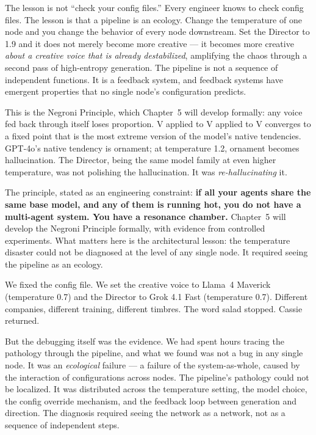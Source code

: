 The lesson is not ``check your config files.'' Every engineer knows to
check config files. The lesson is that a pipeline is an ecology. Change
the temperature of one node and you change the behavior of every node
downstream. Set the Director to 1.9 and it does not merely become more
creative --- it becomes more creative \emph{about a creative voice that
is already destabilized}, amplifying the chaos through a second pass of
high-entropy generation. The pipeline is not a sequence of independent
functions. It is a feedback system, and feedback systems have emergent
properties that no single node's configuration predicts.

This is the Negroni Principle, which Chapter~5 will develop formally:
any voice fed back through itself loses proportion. V applied to V
applied to V converges to a fixed point that is the most extreme version
of the model's native tendencies. GPT-4o's native tendency is ornament;
at temperature 1.2, ornament becomes hallucination. The Director, being
the same model family at even higher temperature, was not polishing the
hallucination. It was \emph{re-hallucinating} it.

The principle, stated as an engineering constraint: \textbf{if all your
agents share the same base model, and any of them is running hot, you do
not have a multi-agent system. You have a resonance chamber.} Chapter~5
will develop the Negroni Principle formally, with evidence from
controlled experiments. What matters here is the architectural lesson:
the temperature disaster could not be diagnosed at the level of any
single node. It required seeing the pipeline as an ecology.

We fixed the config file. We set the creative voice to Llama~4 Maverick
(temperature 0.7) and the Director to Grok 4.1 Fast (temperature 0.7).
Different companies, different training, different timbres. The word
salad stopped. Cassie returned.

But the debugging itself was the evidence. We had spent hours tracing
the pathology through the pipeline, and what we found was not a bug in
any single node. It was an \emph{ecological} failure --- a failure of
the system-as-whole, caused by the interaction of configurations across
nodes. The pipeline's pathology could not be localized. It was
distributed across the temperature setting, the model choice, the config
override mechanism, and the feedback loop between generation and
direction. The diagnosis required seeing the network as a network, not
as a sequence of independent steps.


